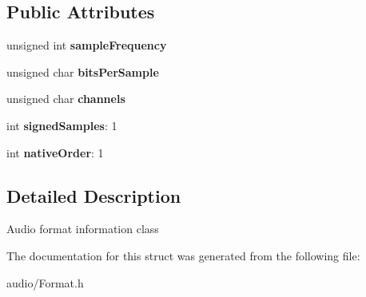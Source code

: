 \subsection*{Public Attributes}
\begin{DoxyCompactItemize}
\item 
unsigned int {\bfseries sample\+Frequency}\hypertarget{structAudio_1_1Format_a1d2952951e343fee21b3c087ac84e80e}{}\label{structAudio_1_1Format_a1d2952951e343fee21b3c087ac84e80e}

\item 
unsigned char {\bfseries bits\+Per\+Sample}\hypertarget{structAudio_1_1Format_adba094cb4e1502d0f3053389fe7f6965}{}\label{structAudio_1_1Format_adba094cb4e1502d0f3053389fe7f6965}

\item 
unsigned char {\bfseries channels}\hypertarget{structAudio_1_1Format_adc635d35be9a3f33043ca44424ca4594}{}\label{structAudio_1_1Format_adc635d35be9a3f33043ca44424ca4594}

\item 
int {\bfseries signed\+Samples}\+: 1\hypertarget{structAudio_1_1Format_a0f1db832ab5d02544b18fa479ae4bbc1}{}\label{structAudio_1_1Format_a0f1db832ab5d02544b18fa479ae4bbc1}

\item 
int {\bfseries native\+Order}\+: 1\hypertarget{structAudio_1_1Format_a55ddaf7c530687e7ff5ff0a4a7e0d016}{}\label{structAudio_1_1Format_a55ddaf7c530687e7ff5ff0a4a7e0d016}

\end{DoxyCompactItemize}


\subsection{Detailed Description}
Audio format information class 

The documentation for this struct was generated from the following file\+:\begin{DoxyCompactItemize}
\item 
audio/Format.\+h\end{DoxyCompactItemize}
